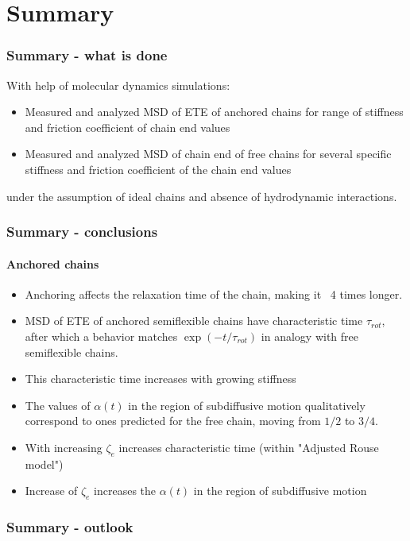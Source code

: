 \documentclass[handout]{beamer}
\begin{document}
\section{Summary}

\begin{frame}
    \frametitle{Summary - what is done}
    With help of molecular dynamics simulations:
    \begin{itemize}
        \item Measured and analyzed MSD of ETE of anchored chains for range of
        stiffness and friction coefficient of chain end values
        \item{Measured and analyzed MSD of chain end of free chains for several specific
        stiffness and friction coefficient of the chain end values}
    \end{itemize}
    under the assumption of ideal chains and absence of hydrodynamic interactions.
\end{frame}

\begin{frame}
    \frametitle{Summary - conclusions}
    \framesubtitle{Anchored chains}
    \begin{itemize}
        \item Anchoring affects the relaxation time of the chain, making it
        ~4 times longer.
        \item MSD of ETE of anchored semiflexible chains have characteristic
        time $\tau_{rot}$, after which a behavior matches $\exp(-t/\tau_{rot})$ 
        in analogy with free semiflexible chains.
        \item This characteristic time increases with growing stiffness
        \item The values of $\alpha(t)$ in the region of subdiffusive motion
        qualitatively correspond to ones predicted for the free chain,
        moving from $1/2$ to $3/4$.
        \item With increasing $\zeta_e$ increases characteristic time (within 
        "Adjusted Rouse model")
        \item Increase of $\zeta_e$ increases the $\alpha(t)$ in the region of
        subdiffusive motion
    \end{itemize}
\end{frame}

\begin{frame}
    \frametitle{Summary - outlook}

\end{frame}
\end{document}
